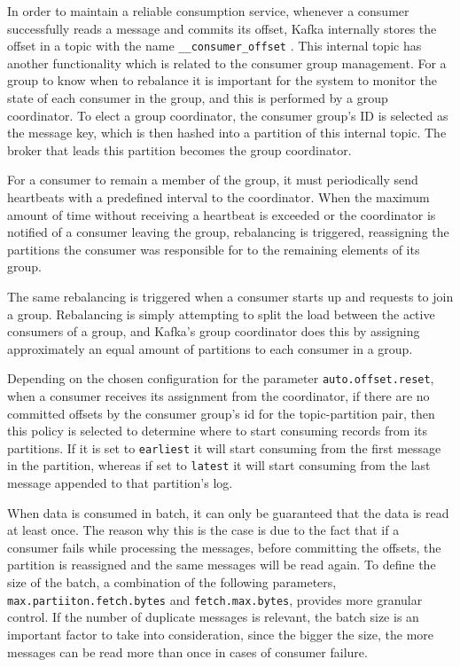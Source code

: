 In order to maintain a reliable consumption service, whenever a consumer
successfully reads a message and commits its offset, Kafka internally stores the
offset in a topic with the name \lstinline{__consumer_offset}
\cite{KafkaConsumer}. This internal topic has another functionality which is
related to the consumer group management. For a group to know when to rebalance
it is important for the system to monitor the state of each consumer in the
group, and this is performed by a group coordinator. To elect a group
coordinator, the consumer group's ID is selected as the message key, which is
then hashed into a partition of this internal topic. The broker that leads this
partition becomes the group coordinator.

For a consumer to remain a member of the group, it must periodically send
heartbeats with a predefined interval to the coordinator. When the maximum
amount of time without receiving a heartbeat is exceeded or the coordinator is
notified of a consumer leaving the group, rebalancing is triggered, reassigning
the partitions the consumer was responsible for to the remaining elements of its
group.

The same rebalancing is triggered when a consumer starts up and requests to join
a group. Rebalancing is simply attempting to split the load between the active
consumers of a group, and Kafka's group coordinator does this by assigning
approximately an equal amount of partitions to each consumer in a group. 

Depending on the chosen configuration for the parameter
\lstinline{auto.offset.reset}, when a consumer receives its assignment from the
coordinator, if there are no committed offsets by the consumer group's id for
the topic-partition pair, then this policy is selected to determine where to
start consuming records from its partitions. If it is set to \lstinline{earliest}
it will start consuming from the first message in the partition, whereas if set to
\lstinline{latest} it will start consuming from the last message appended to that
partition's log.

When data is consumed in batch, it can only be guaranteed that the data is read
at least once. The reason why this is the case is due to the fact that if a
consumer fails while processing the messages, before committing the offsets, the
partition is reassigned and the same messages will be read again. To define the
size of the batch, a combination of the following parameters,
\lstinline{max.partiiton.fetch.bytes} and \lstinline{fetch.max.bytes}, provides
more granular control. If the number of duplicate messages is relevant, the
batch size is an important factor to take into consideration, since the bigger
the size, the more messages can be read more than once in cases of consumer
failure.

